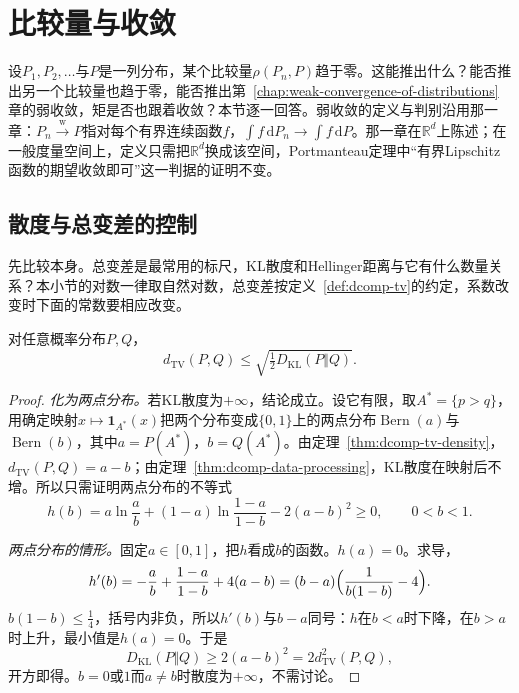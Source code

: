 \section{比较量与收敛}
\label{sec:dcomp-convergence}

设$P_1,P_2,\dots$与$P$是一列分布，某个比较量$\rho(P_n,P)$趋于零。这能推出什么？能否推出另一个比较量也趋于零，能否推出第~\ref{chap:weak-convergence-of-distributions}章的弱收敛，矩是否也跟着收敛？本节逐一回答。弱收敛的定义与判别沿用那一章：$P_n\xrightarrow{\mathrm{w}}P$指对每个有界连续函数$f$，$\int f\,\mathrm{d}P_n\to\int f\,\mathrm{d}P$。那一章在$\mathbb{R}^{d}$上陈述；在一般度量空间上，定义只需把$\mathbb{R}^{d}$换成该空间，Portmanteau定理中“有界Lipschitz函数的期望收敛即可”这一判据的证明不变。

\subsection{散度与总变差的控制}
\label{sec:dcomp-pinsker}

先比较本身。总变差是最常用的标尺，KL散度和Hellinger距离与它有什么数量关系？本小节的对数一律取自然对数，总变差按定义~\ref{def:dcomp-tv}的约定，系数改变时下面的常数要相应改变。

\begin{theorem}[Pinsker不等式]
\label{thm:dcomp-pinsker}
对任意概率分布$P,Q$，
\begin{equation}
 d_{\mathrm{TV}}(P,Q)\leq\sqrt{\tfrac12D_{\mathrm{KL}}(P\Vert Q)} .
 \label{eq:dcomp-pinsker}
\end{equation}
\end{theorem}

\begin{proof}
\emph{化为两点分布。}若KL散度为$+\infty$，结论成立。设它有限，取$A^{*}=\{p>q\}$，用确定映射$x\mapsto\mathbf{1}_{A^{*}}(x)$把两个分布变成$\{0,1\}$上的两点分布$\operatorname{Bern}(a)$与$\operatorname{Bern}(b)$，其中$a=P(A^{*})$，$b=Q(A^{*})$。由定理~\ref{thm:dcomp-tv-density}，$d_{\mathrm{TV}}(P,Q)=a-b$；由定理~\ref{thm:dcomp-data-processing}，KL散度在映射后不增。所以只需证明两点分布的不等式
\[
 h(b)=a\ln\frac{a}{b}+(1-a)\ln\frac{1-a}{1-b}-2(a-b)^{2}\geq0,\qquad 0<b<1 .
\]

\emph{两点分布的情形。}固定$a\in[0,1]$，把$h$看成$b$的函数。$h(a)=0$。求导，
\[
 h'(b)=-\frac{a}{b}+\frac{1-a}{1-b}+4(a-b)=(b-a)\Bigl(\frac{1}{b(1-b)}-4\Bigr) .
\]
$b(1-b)\leq\tfrac14$，括号内非负，所以$h'(b)$与$b-a$同号：$h$在$b<a$时下降，在$b>a$时上升，最小值是$h(a)=0$。于是
\[
 D_{\mathrm{KL}}(P\Vert Q)\geq2(a-b)^{2}=2d_{\mathrm{TV}}^{2}(P,Q),
\]
开方即得。$b=0$或$1$而$a\neq b$时散度为$+\infty$，不需讨论。
\end{proof}

